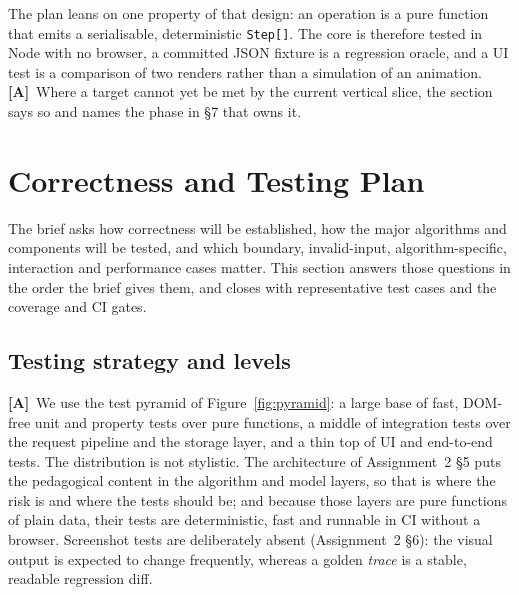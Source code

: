 \documentclass[11pt,a4paper]{article}
\newcommand{\A}{\textcolor{asmc}{\textbf{[A]}}}     %
\newcommand{\ct}[1]{\texttt{#1}}
\begin{document}
The plan leans on one property of that design: an operation is a pure function that emits a
serialisable, deterministic \ct{Step[]}. The core is therefore tested in Node with no browser,
a committed JSON fixture is a regression oracle, and a UI test is a comparison of two renders
rather than a simulation of an animation. \A\ Where a target cannot yet be met by the current
vertical slice, the section says so and names the phase in \S7 that owns it.

\section{Correctness and Testing Plan}

The brief asks how correctness will be established, how the major algorithms and components
will be tested, and which boundary, invalid-input, algorithm-specific, interaction and
performance cases matter. This section answers those questions in the order the brief gives
them, and closes with representative test cases and the coverage and CI gates.

\subsection{Testing strategy and levels}

\A\ We use the test pyramid of Figure~\ref{fig:pyramid}: a large base of fast, DOM-free unit
and property tests over pure functions, a middle of integration tests over the request
pipeline and the storage layer, and a thin top of UI and end-to-end tests. The distribution
is not stylistic. The architecture of Assignment~2 \S5 puts the pedagogical content in the
algorithm and model layers, so that is where the risk is and where the tests should be; and
because those layers are pure functions of plain data, their tests are deterministic, fast
and runnable in CI without a browser. Screenshot tests are deliberately absent
(Assignment~2 \S6): the visual output is expected to change frequently, whereas a golden
\emph{trace} is a stable, readable regression diff.
\end{document}
